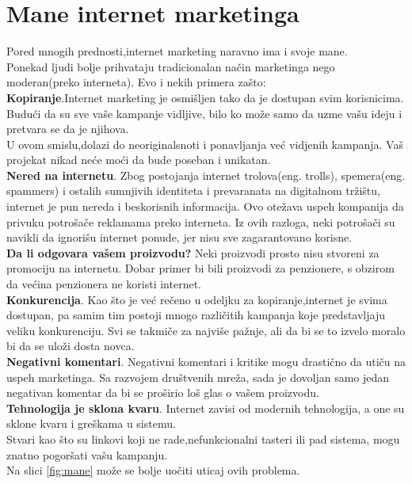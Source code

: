 \documentclass[a4paper]{article}
\begin{document}
{\section{Mane internet marketinga}
\label{sec:mane}
Pored mnogih prednosti,internet marketing naravno ima i svoje mane.
\\Ponekad ljudi bolje prihvataju tradicionalan način marketinga nego moderan(preko interneta). Evo i nekih primera zašto:
\\\textbf{Kopiranje}.Internet marketing je osmišljen tako da je dostupan svim korisnicima. Budući da su sve vaše kampanje vidljive, bilo ko može samo da uzme vašu ideju i pretvara se da je njihova.
\\U ovom smislu,dolazi do neoriginalsnoti i ponavljanja već vidjenih kampanja. Vaš projekat nikad neće moći da bude poseban i unikatan.
\\\textbf{Nered na internetu}.
Zbog postojanja internet trolova(eng. trolls), spemera(eng. spammers) i ostalih sumnjivih identiteta i prevaranata na digitalnom tržištu, internet je pun nereda i beskorisnih informacija. Ovo otežava uspeh kompanija da privuku potrošače reklamama preko interneta. Iz ovih razloga, neki potrošači su navikli da ignorišu internet ponude, jer nisu sve zagarantovano korisne.
\\\textbf{Da li odgovara vašem proizvodu?}
Neki proizvodi prosto nisu stvoreni za promociju na internetu. Dobar primer bi bili proizvodi za penzionere, s obzirom da većina penzionera ne koristi internet.
\\\textbf{Konkurencija}.
Kao što je već rečeno u odeljku za kopiranje,internet je svima dostupan, pa samim tim postoji mnogo različitih kampanja koje predstavljaju veliku konkurenciju. Svi se takmiče za najviše pažnje, ali da bi se to izvelo moralo bi da se uloži dosta novca.
\\\textbf{Negativni komentari}.
Negativni komentari i kritike mogu drastično da utiču na uspeh marketinga. Sa razvojem društvenih mreža, sada je dovoljan samo jedan negativan komentar da bi se proširio loš glas o vašem proizvodu.
\\\textbf{Tehnologija je sklona kvaru}.
 Internet zavisi od modernih tehnologija, a one su sklone kvaru i greškama u sistemu.
\\Stvari kao što su linkovi koji ne rade,nefunkcionalni tasteri ili pad sistema, mogu znatno pogoršati vašu kampanju.
\cite{prednosti i mane}
\\Na slici \ref{fig:mane} može se bolje uočiti uticaj ovih problema.
\begin{figure}[h!]

\end{figure}}
\end{document}

